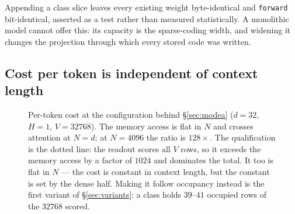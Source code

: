 \documentclass[11pt,a4paper]{article}
\begin{document}
Appending a class slice leaves every existing weight byte-identical and
\texttt{forward} bit-identical, asserted as a test rather than measured
statistically. A monolithic model cannot offer this: its capacity is the
sparse-coding width, and widening it changes the projection through which every
stored code was written.

\subsection{Cost per token is independent of context length}
\label{sec:cost}

\begin{figure}[h]
\centering
{}
\caption{Per-token cost at the configuration behind \S\ref{sec:modea}
($d=32$, $H=1$, $V=32768$). The memory access is flat in $N$ and crosses
attention at $N=d$; at $N=4096$ the ratio is $128\times$. The qualification is
the dotted line: the readout scores all $V$ rows, so it exceeds the memory
access by a factor of $1024$ and dominates the total. It too is flat in $N$ ---
the cost is constant in context length, but the constant is set by the dense
half. Making it follow occupancy instead is the first variant of
\S\ref{sec:variants}: a class holds $39$--$41$ occupied rows of the $32768$
scored.}
\label{fig:cost}
\end{figure}
\end{document}
